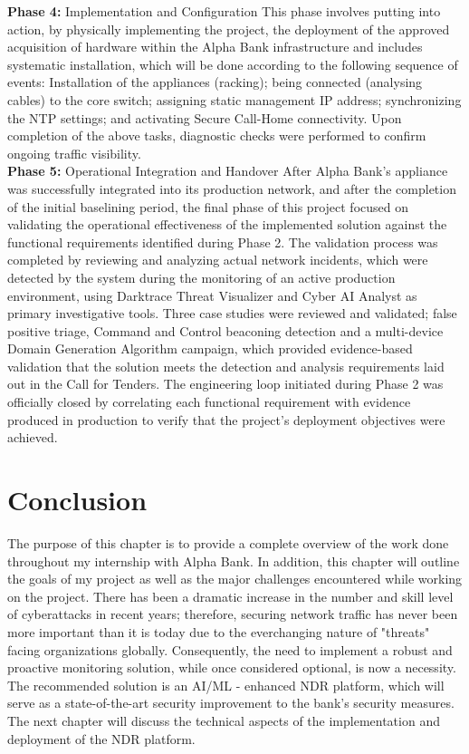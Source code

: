 \documentclass[12pt,a4paper]{report}
\begin{document}
\textbf{Phase 4:} Implementation and Configuration 
This phase involves putting into action, by physically implementing the project, the deployment of the approved acquisition of hardware within the Alpha Bank infrastructure and includes systematic installation, which will be done according to the following sequence of events: Installation of the appliances (racking); being connected (analysing cables) to the core switch; assigning static management IP address; synchronizing the NTP settings; and activating Secure Call-Home connectivity. Upon completion of the above tasks, diagnostic checks were performed to confirm ongoing traffic visibility.\\


\textbf{Phase 5:} Operational Integration and Handover
After Alpha Bank's appliance was successfully integrated into its production network, and after the completion of the initial baselining period, the final phase of this project focused on validating the operational effectiveness of the implemented solution against the functional requirements identified during Phase 2. The validation process was completed by reviewing and analyzing actual network incidents, which were detected by the system during the monitoring of an active production environment, using Darktrace Threat Visualizer and Cyber AI Analyst as primary investigative tools. Three case studies were reviewed and validated; false positive triage, Command and Control beaconing detection and a multi-device Domain Generation Algorithm campaign, which provided evidence-based validation that the solution meets the detection and analysis requirements laid out in the Call for Tenders. The engineering loop initiated during Phase 2 was officially closed by correlating each functional requirement with evidence produced in production to verify that the project's deployment objectives were achieved.

\section{Conclusion}

The purpose of this chapter is to provide a complete overview of the work done throughout my internship with Alpha Bank. In addition, this chapter will outline the goals of my project as well as the major challenges encountered while working on the project. There has been a dramatic increase in the number and skill level of cyberattacks in recent years; therefore, securing network traffic has never been more important than it is today due to the everchanging nature of "threats" facing organizations globally. Consequently, the need to implement a robust and proactive monitoring solution, while once considered optional, is now a necessity. The recommended solution is an AI/ML - enhanced NDR platform, which will serve as a state-of-the-art security improvement to the bank's security measures. The next chapter will discuss the technical aspects of the implementation and deployment of the NDR platform.
\end{document}
